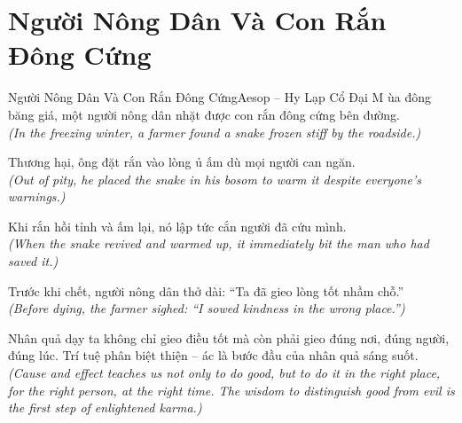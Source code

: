 \section{Người Nông Dân Và Con Rắn Đông Cứng}
\begin{truyen}{Người Nông Dân Và Con Rắn Đông Cứng}{Aesop -- Hy Lạp Cổ Đại}
M ùa đông băng giá, một người nông dân nhặt được con rắn đông cứng bên đường.\\
\textit{(In the freezing winter, a farmer found a snake frozen stiff by the roadside.)}

Thương hại, ông đặt rắn vào lòng ủ ấm dù mọi người can ngăn.\\
\textit{(Out of pity, he placed the snake in his bosom to warm it despite everyone's warnings.)}

Khi rắn hồi tỉnh và ấm lại, nó lập tức cắn người đã cứu mình.\\
\textit{(When the snake revived and warmed up, it immediately bit the man who had saved it.)}

Trước khi chết, người nông dân thở dài: ``Ta đã gieo lòng tốt nhầm chỗ.''\\
\textit{(Before dying, the farmer sighed: ``I sowed kindness in the wrong place.'')}

\end{truyen}
\begin{baihoc}
  Nhân quả dạy ta không chỉ gieo điều tốt mà còn phải gieo đúng nơi, đúng người, đúng lúc. Trí tuệ phân biệt thiện -- ác là bước đầu của nhân quả sáng suốt.\\
  \textit{(Cause and effect teaches us not only to do good, but to do it in the right place, for the right person, at the right time. The wisdom to distinguish good from evil is the first step of enlightened karma.)}
\end{baihoc}

